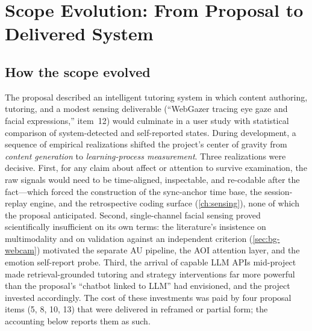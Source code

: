 \chapter{Scope Evolution: From Proposal to Delivered System}
\label{ch:scope}


\section{How the scope evolved}
\label{sec:scope-how}

The proposal described an intelligent tutoring system in which content
authoring, tutoring, and a modest sensing deliverable (``WebGazer tracing
eye gaze and facial expressions,'' item~12) would culminate in a user
study with statistical comparison of system-detected and self-reported
states. During development, a sequence of empirical realizations shifted
the project's center of gravity from \emph{content generation} to
\emph{learning-process measurement}. Three realizations were decisive.
First, for any claim about affect or attention to survive examination, the
raw signals would need to be time-aligned, inspectable, and re-codable
after the fact---which forced the construction of the sync-anchor time
base, the session-replay engine, and the retrospective coding surface
(\cref{ch:sensing}), none of which the proposal anticipated. Second,
single-channel facial sensing proved scientifically insufficient on its
own terms: the literature's insistence on multimodality and on validation
against an independent criterion (\cref{sec:bg-webcam}) motivated the
separate AU pipeline, the AOI attention layer, and the emotion self-report
probe. Third, the arrival of capable LLM APIs mid-project made
retrieval-grounded tutoring and strategy interventions far more powerful
than the proposal's ``chatbot linked to LLM'' had envisioned, and the
project invested accordingly. The cost of these investments was paid by
four proposal items (5, 8, 10, 13) that were delivered in reframed or
partial form; the accounting below reports them as such.

